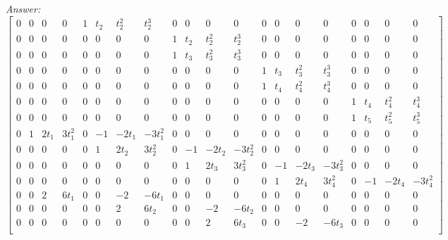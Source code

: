 \documentclass{article}
\newenvironment{answer}{\textit{Answer:}}{}
\begin{document}
\begin{answer}
\begin{equation*}
\begin{bmatrix}
            0 & 0   & 0     & 0      & 1 & t_2 & t_2^2 & t_2^3   & 0 & 0   & 0     & 0       & 0 & 0   & 0     & 0       & 0 & 0   & 0     & 0       \\
            0 & 0   & 0     & 0      & 0 & 0   & 0     & 0       & 1 & t_2 & t_2^2 & t_2^3   & 0 & 0   & 0     & 0       & 0 & 0   & 0     & 0       \\
            0 & 0   & 0     & 0      & 0 & 0   & 0     & 0       & 1 & t_3 & t_3^2 & t_3^3   & 0 & 0   & 0     & 0       & 0 & 0   & 0     & 0       \\
            0 & 0   & 0     & 0      & 0 & 0   & 0     & 0       & 0 & 0   & 0     & 0       & 1 & t_3 & t_3^2 & t_3^3   & 0 & 0   & 0     & 0       \\
            0 & 0   & 0     & 0      & 0 & 0   & 0     & 0       & 0 & 0   & 0     & 0       & 1 & t_4 & t_4^2 & t_4^3   & 0 & 0   & 0     & 0       \\
            0 & 0   & 0     & 0      & 0 & 0   & 0     & 0       & 0 & 0   & 0     & 0       & 0 & 0   & 0     & 0       & 1 & t_4 & t_4^2 & t_4^3   \\
            0 & 0   & 0     & 0      & 0 & 0   & 0     & 0       & 0 & 0   & 0     & 0       & 0 & 0   & 0     & 0       & 1 & t_5 & t_5^2 & t_5^3   \\
            0 & 1   & 2t_1  & 3t_1^2 & 0 & -1  & -2t_1 & -3t_1^2 & 0 & 0   & 0     & 0       & 0 & 0   & 0     & 0       & 0 & 0   & 0     & 0       \\
            0 & 0   & 0     & 0      & 0 & 1   & 2t_2  & 3t_2^2  & 0 & -1  & -2t_2 & -3t_2^2 & 0 & 0   & 0     & 0       & 0 & 0   & 0     & 0       \\
            0 & 0   & 0     & 0      & 0 & 0   & 0     & 0       & 0 & 1   & 2t_3  & 3t_3^2  & 0 & -1  & -2t_3 & -3t_3^2 & 0 & 0   & 0     & 0       \\
            0 & 0   & 0     & 0      & 0 & 0   & 0     & 0       & 0 & 0   & 0     & 0       & 0 & 1   & 2t_4  & 3t_4^2  & 0 & -1  & -2t_4 & -3t_4^2 \\
            0 & 0   & 2     & 6t_1   & 0 & 0   & -2    & -6t_1   & 0 & 0   & 0     & 0       & 0 & 0   & 0     & 0       & 0 & 0   & 0     & 0       \\
            0 & 0   & 0     & 0      & 0 & 0   & 2     & 6t_2    & 0 & 0   & -2    & -6t_2   & 0 & 0   & 0     & 0       & 0 & 0   & 0     & 0       \\
            0 & 0   & 0     & 0      & 0 & 0   & 0     & 0       & 0 & 0   & 2     & 6t_3    & 0 & 0   & -2    & -6t_3   & 0 & 0   & 0     & 0       \\

\end{bmatrix}
\end{equation*}
\end{answer}
\end{document}
